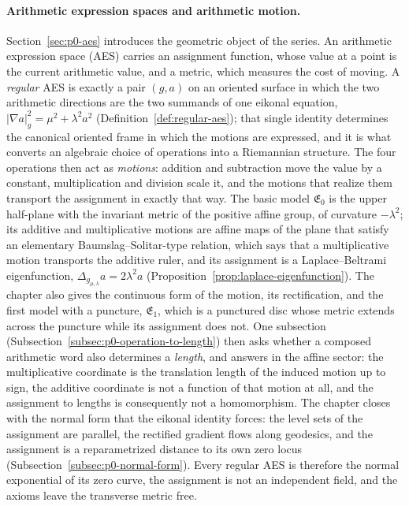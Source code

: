 \paragraph{Arithmetic expression spaces and arithmetic motion.}
Section~\ref{sec:p0-aes} introduces the geometric object of the series.  An
arithmetic expression space (AES) carries an assignment function, whose value at
a point is the current arithmetic value, and a metric, which measures the cost
of moving.  A \emph{regular} AES is exactly a pair $(g,a)$ on an oriented surface
in which the two arithmetic directions are the two summands of one eikonal
equation, $|\nabla a|_g^2=\mu^2+\lambda^2a^2$
(Definition~\ref{def:regular-aes}); that single identity determines the
canonical oriented frame in which the motions are expressed, and it is what
converts an algebraic choice of operations into a Riemannian structure.  The
four operations then act as \emph{motions}: addition and subtraction move
the value by a constant, multiplication and division scale it, and the motions
that realize them transport the assignment in exactly that way.  The basic
model $\mathfrak E_0$ is the upper half-plane with the invariant metric of the
positive affine group, of curvature $-\lambda^2$; its additive and multiplicative
motions are affine maps of the plane that satisfy an elementary
Baumslag--Solitar-type relation, which says that a multiplicative motion
transports the additive ruler, and its assignment is a Laplace--Beltrami
eigenfunction, $\Delta_{g_{\mu,\lambda}}a=2\lambda^2a$
(Proposition~\ref{prop:laplace-eigenfunction}).  The
chapter also gives the continuous form of the motion, its rectification, and the
first model with a puncture, $\mathfrak E_1$, which is a punctured disc whose
metric extends across the puncture while its assignment does not.  One subsection
(Subsection~\ref{subsec:p0-operation-to-length}) then asks whether a composed
arithmetic word also determines a \emph{length}, and answers in the affine sector:
the multiplicative coordinate is the translation length of the induced motion up to
sign, the additive coordinate is not a function of that motion at all, and the
assignment to lengths is consequently not a homomorphism.  The chapter closes
with the normal form that the eikonal identity forces: the level sets of the
assignment are parallel, the rectified gradient flows along geodesics, and the
assignment is a reparametrized distance to its own zero locus
(Subsection~\ref{subsec:p0-normal-form}).  Every regular AES is therefore the
normal exponential of its zero curve, the assignment is not an independent
field, and the axioms leave the transverse metric free.

